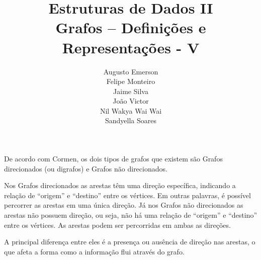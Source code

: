 \documentclass{article}
\title{
    \textbf{Estruturas de Dados II}\\
    Grafos – Definições e Representações - V
}
\author{
    Augusto Emerson\\
    Felipe Monteiro\\
    Jaime Silva\\
    João Victor\\
    Nil Wakya Wai Wai\\
    Sandyella Soares 
}
\date{} %
\newcommand{\quotes}[1]{``#1''}
\begin{document}
\begin{titlepage}
    \maketitle
    \thispagestyle{empty}  
\end{titlepage}

\section{} %
    De acordo com Cormen, os dois tipos de grafos que existem são Grafos direcionados (ou digrafos) e Grafos não direcionados.
    
    Nos Grafos direcionados as arestas têm uma direção específica, indicando a relação de \quotes{origem} e \quotes{destino} entre os vértices. Em outras palavras, é possível percorrer as arestas em uma única direção. Já nos Grafos não direcionados as arestas não possuem direção, ou seja, não há uma relação de \quotes{origem} e \quotes{destino} entre os vértices. As arestas podem ser percorridas em ambas as direções.
    
    A principal diferença entre eles é a presença ou ausência de direção nas arestas, o que afeta a forma como a informação flui através do grafo.

\section{} %
    \subsection{}
\end{document}
